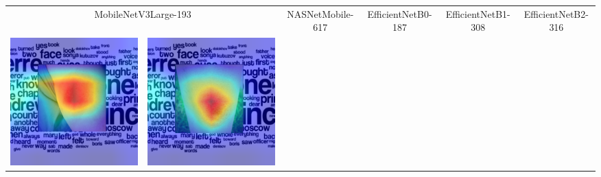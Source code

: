 \begin{landscape}
\begin{table}[]
\begin{tabular}{@{}c c c c c c c c c c@{}}
			\multicolumn{2}{c}{MobileNetV3Large-193} & \multicolumn{2}{c}{NASNetMobile-617} & \multicolumn{2}{c}{EfficientNetB0-187} & \multicolumn{2}{c}{EfficientNetB1-308} & \multicolumn{2}{c}{EfficientNetB2-316}\\
			\includegraphics[width=.12\textheight ,keepaspectratio]{images/pretraining/gradcam/3/MobileNetV3LargeCombinedGradCam.png} &
			\includegraphics[width=.12\textheight ,keepaspectratio]{images/pretraining/gradcam/9/MobileNetV3LargeCombinedGradCam.png} &

\end{tabular}
\end{table}
\end{landscape}
